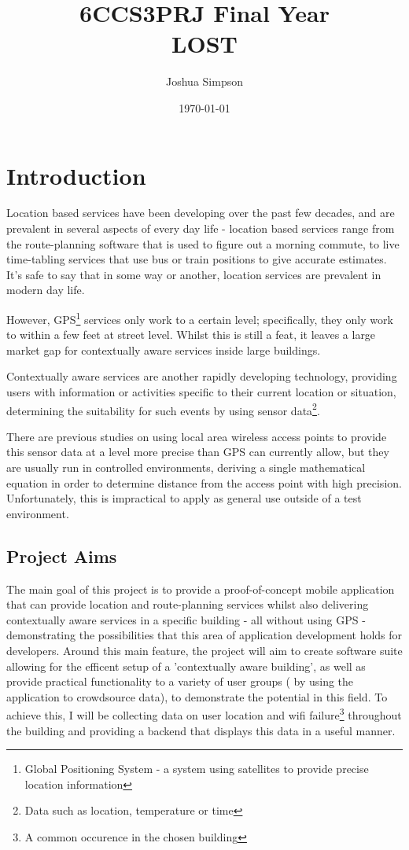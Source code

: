 \documentclass[11pt]{informatics-report}
\title{6CCS3PRJ Final Year\\\vspace{0.2cm} LOST}
\author{Joshua Simpson}
\date{\today}
\begin{document}
\createFrontMatter
\onehalfspacing
\tableofcontents
\doublespacing


\chapter{Introduction}
Location based services have been developing over the past few decades, and are prevalent in several aspects of every day life - location based services range from the route-planning software that is used to figure out a morning commute, to live time-tabling services that use bus or train positions to give accurate estimates. It's safe to say that in some way or another, location services are prevalent in modern day life.

However, GPS\footnote{ Global Positioning System - a system using satellites to provide precise location information} services only work to a certain level;  specifically, they only work to within a few feet at street level\cite{cook2005indoor}. Whilst this is still a feat, it leaves a large market gap for contextually aware services inside large buildings. 

Contextually aware services are another rapidly developing technology, providing users with information or activities specific to their current location or situation, determining the suitability for such events by using sensor data\footnote{ Data such as location, temperature or time }. 

There are previous studies on using local area wireless access points to provide this sensor data at a level more precise than GPS can currently allow, but they are usually run in controlled environments, deriving a single mathematical equation in order to determine distance from the access point with high precision\cite{996891}. Unfortunately, this is impractical to apply as general use outside of a test environment.
\newline \newline 


\section{Project Aims}

The main goal of this project is to provide a proof-of-concept mobile application that can provide location and route-planning services whilst also delivering contextually aware services in a specific building - all without using GPS - demonstrating the possibilities that this area of application development holds for developers. Around this main feature, the project will aim to create software suite allowing for the efficent setup of a 'contextually aware building', as well as provide practical functionality to a variety of user groups ( by using the application to crowdsource data), to demonstrate the potential in this field. To achieve this, I will be collecting data on user location and wifi failure\footnote{A common occurence in the chosen building} throughout the building and providing a backend that displays this data in a useful manner.
\end{document}
